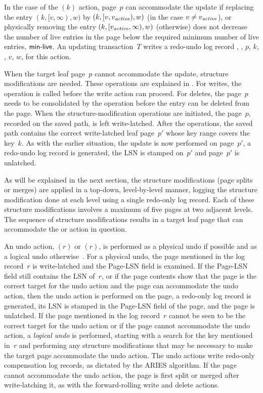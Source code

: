 In the case of the $(k)$ action, page~$p$ can
accommodate the update if replacing the entry $(k,[v,\infty),w)$ by
$(k,[v,\smash{v_{\text{\textit{active}}}}),w)$ (in the case $v \neq \smash{v_{\text{\textit{active}}}}$), or physically removing
the entry $(k,[\smash{v_{\text{\textit{active}}}},\infty),w)$ (otherwise) does not decrease the number
of live entries in the page below the required minimum number of live entries,
$\text{\textsf{min-live}}$.
An updating transaction~$T$ writes a redo-undo log record
, , $p$, $k$, \actver, $v$, $w$,  for this
action.

When the target leaf page~$p$ cannot accommodate the update,
structure modifications are needed. 
These operations are explained in . 
For writes, the operation  is called before
the write action can proceed. 
For deletes, the page~$p$ needs to be consolidated by the operation
 before the entry can be deleted from the page.
When the structure-modification operations are initiated, the page~$p$,
recorded on the saved path, is left write-latched. 
After the operations, the saved path contains the correct write-latched leaf
page~$p'$ whose key range covers the key~$k$. 
As with the earlier situation, the update is now performed on page~$p'$, a
redo-undo log record is generated, the LSN is stamped on~$p'$ and page~$p'$
is unlatched.

As will be explained in the next section, the structure modifications
(page splits or merges) are applied in a top-down, level-by-level
manner, logging the structure modification done at each level using
a single redo-only log record.
Each of these structure modifications involves a maximum of five pages
at two adjacent levels.
The sequence of structure modifications results in a target leaf page that
can accommodate the  or  action in question.

An undo action, $(r)$ or $(r)$,
is performed as a physical undo if possible and as a logical undo
otherwise~\cite{mohan:1992:aries}.
For a physical undo, the page mentioned in the log record~$r$ is
write-latched and the Page-LSN field is examined.
If the Page-LSN field still contains the LSN of~$r$, or if
the page contents show that the page is the correct target for the
undo action and the page can accommodate the undo action, then the undo
action is performed on the page, a redo-only log record is generated, its
LSN is stamped in the Page-LSN field of the page, and the page is
unlatched.
If the page mentioned in the log record~$r$ cannot be seen
to be the correct target for the undo action or if the page cannot
accommodate the undo action, a \emph{logical undo}
is performed, starting with a search for the key mentioned in~$r$
and performing any structure modifications that may be necessary to
make the target page accommodate the undo action.
The undo actions write redo-only compensation log records, as dictated
by the ARIES algorithm.
If the page cannot accommodate the undo action, the page is first split
or merged after write-latching it, as with the forward-rolling write
and delete actions.

